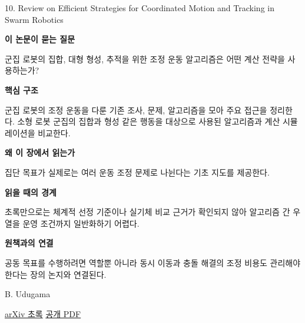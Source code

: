 \documentclass[11pt,openany]{book}
\begin{document}
\begin{termcard}{10. Review on Efficient Strategies for Coordinated Motion and Tracking in Swarm Robotics}

\par

\medskip

{\sffamily\bfseries\color{deepblue} 이 논문이 묻는 질문}\par

군집 로봇의 집합, 대형 형성, 추적을 위한 조정 운동 알고리즘은 어떤 계산 전략을 사용하는가?

\smallskip

{\sffamily\bfseries\color{deepblue} 핵심 구조}\par

군집 로봇의 조정 운동을 다룬 기존 조사, 문제, 알고리즘을 모아 주요 접근을 정리한다. 소형 로봇 군집의 집합과 형성 같은 행동을 대상으로 사용된 알고리즘과 계산 시뮬레이션을 비교한다.

\smallskip

{\sffamily\bfseries\color{deepblue} 왜 이 장에서 읽는가}\par

집단 목표가 실제로는 여러 운동 조정 문제로 나뉜다는 기초 지도를 제공한다.

\smallskip

{\sffamily\bfseries\color{coral} 읽을 때의 경계}\par

초록만으로는 체계적 선정 기준이나 실기체 비교 근거가 확인되지 않아 알고리즘 간 우열을 운영 조건까지 일반화하기 어렵다.

\smallskip

{\sffamily\bfseries\color{teal} 원책과의 연결}\par

공동 목표를 수행하려면 역할뿐 아니라 동시 이동과 충돌 해결의 조정 비용도 관리해야 한다는 장의 논지와 연결된다.

\medskip

{\footnotesize\color{muted} B. Udugama\par

\href{https://arxiv.org/abs/2302.06360}{arXiv 초록} \quad \href{https://arxiv.org/pdf/2302.06360}{공개 PDF}\par}

\end{termcard}
\end{document}

